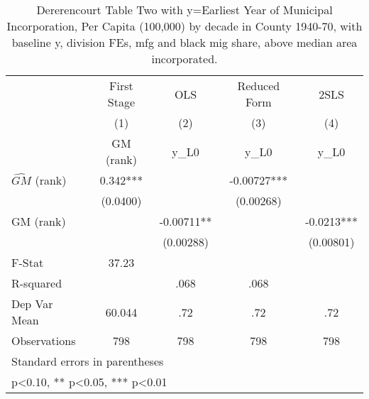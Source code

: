 \begin{table}[htbp]\centering
\def\sym#1{\ifmmode^{#1}\else\(^{#1}\)\fi}
\caption{Dererencourt Table Two with y=Earliest Year of Municipal Incorporation, Per Capita (100,000) by decade in County 1940-70, with baseline y, division FEs, mfg and black mig share, above median area incorporated.}
\begin{tabular}{l*{4}{c}}
\toprule
                    & First Stage   &         OLS   &Reduced Form   &        2SLS   \\
                    &\multicolumn{1}{c}{(1)}&\multicolumn{1}{c}{(2)}&\multicolumn{1}{c}{(3)}&\multicolumn{1}{c}{(4)}\\
                    &\multicolumn{1}{c}{GM  (rank)}&\multicolumn{1}{c}{y\_L0}&\multicolumn{1}{c}{y\_L0}&\multicolumn{1}{c}{y\_L0}\\
\midrule
$\hat{GM}$ (rank)   &       0.342***&               &    -0.00727***&               \\
                    &    (0.0400)   &               &   (0.00268)   &               \\
\addlinespace
GM  (rank)          &               &    -0.00711** &               &     -0.0213***\\
                    &               &   (0.00288)   &               &   (0.00801)   \\
\midrule
F-Stat              &       37.23   &               &               &               \\
R-squared           &               &        .068   &        .068   &               \\
Dep Var Mean        &      60.044   &         .72   &         .72   &         .72   \\
Observations        &         798   &         798   &         798   &         798   \\
\bottomrule
\multicolumn{5}{l}{\footnotesize Standard errors in parentheses}\\
\multicolumn{5}{l}{\footnotesize * p<0.10, ** p<0.05, *** p<0.01}\\
\end{tabular}
\end{table}
